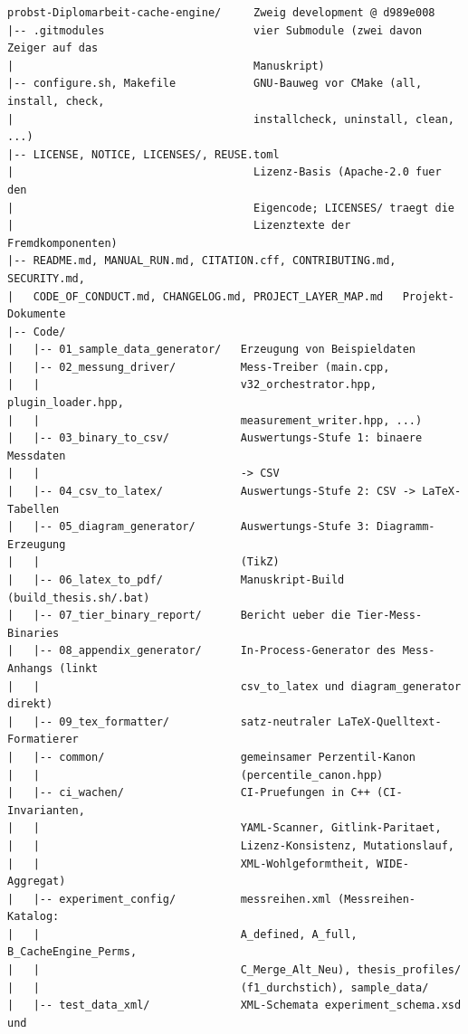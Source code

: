 {\footnotesize
\begin{verbatim}
probst-Diplomarbeit-cache-engine/     Zweig development @ d989e008
|-- .gitmodules                       vier Submodule (zwei davon Zeiger auf das
|                                     Manuskript)
|-- configure.sh, Makefile            GNU-Bauweg vor CMake (all, install, check,
|                                     installcheck, uninstall, clean, ...)
|-- LICENSE, NOTICE, LICENSES/, REUSE.toml
|                                     Lizenz-Basis (Apache-2.0 fuer den
|                                     Eigencode; LICENSES/ traegt die
|                                     Lizenztexte der Fremdkomponenten)
|-- README.md, MANUAL_RUN.md, CITATION.cff, CONTRIBUTING.md, SECURITY.md,
|   CODE_OF_CONDUCT.md, CHANGELOG.md, PROJECT_LAYER_MAP.md   Projekt-Dokumente
|-- Code/
|   |-- 01_sample_data_generator/   Erzeugung von Beispieldaten
|   |-- 02_messung_driver/          Mess-Treiber (main.cpp,
|   |                               v32_orchestrator.hpp, plugin_loader.hpp,
|   |                               measurement_writer.hpp, ...)
|   |-- 03_binary_to_csv/           Auswertungs-Stufe 1: binaere Messdaten
|   |                               -> CSV
|   |-- 04_csv_to_latex/            Auswertungs-Stufe 2: CSV -> LaTeX-Tabellen
|   |-- 05_diagram_generator/       Auswertungs-Stufe 3: Diagramm-Erzeugung
|   |                               (TikZ)
|   |-- 06_latex_to_pdf/            Manuskript-Build (build_thesis.sh/.bat)
|   |-- 07_tier_binary_report/      Bericht ueber die Tier-Mess-Binaries
|   |-- 08_appendix_generator/      In-Process-Generator des Mess-Anhangs (linkt
|   |                               csv_to_latex und diagram_generator direkt)
|   |-- 09_tex_formatter/           satz-neutraler LaTeX-Quelltext-Formatierer
|   |-- common/                     gemeinsamer Perzentil-Kanon
|   |                               (percentile_canon.hpp)
|   |-- ci_wachen/                  CI-Pruefungen in C++ (CI-Invarianten,
|   |                               YAML-Scanner, Gitlink-Paritaet,
|   |                               Lizenz-Konsistenz, Mutationslauf,
|   |                               XML-Wohlgeformtheit, WIDE-Aggregat)
|   |-- experiment_config/          messreihen.xml (Messreihen-Katalog:
|   |                               A_defined, A_full, B_CacheEngine_Perms,
|   |                               C_Merge_Alt_Neu), thesis_profiles/
|   |                               (f1_durchstich), sample_data/
|   |-- test_data_xml/              XML-Schemata experiment_schema.xsd und

\end{verbatim}}
